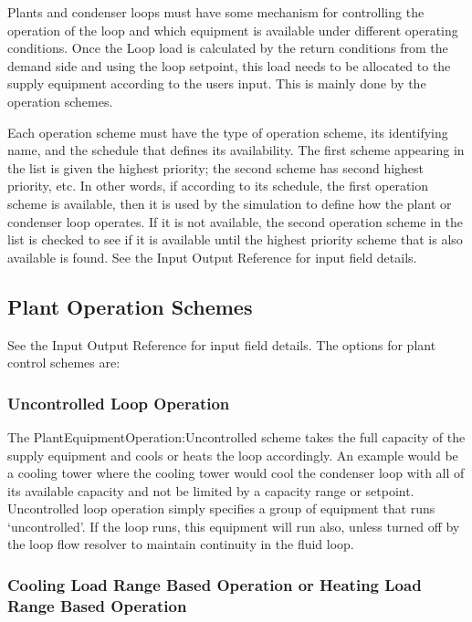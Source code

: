 Plants and condenser loops must have some mechanism for controlling the operation of the loop and which equipment is available under different operating conditions. Once the Loop load is calculated by the return conditions from the demand side and using the loop setpoint, this load needs to be allocated to the supply equipment according to the users input. This is mainly done by the operation schemes.

Each operation scheme must have the type of operation scheme, its identifying name, and the schedule that defines its availability. The first scheme appearing in the list is given the highest priority; the second scheme has second highest priority, etc. In other words, if according to its schedule, the first operation scheme is available, then it is used by the simulation to define how the plant or condenser loop operates. If it is not available, the second operation scheme in the list is checked to see if it is available until the highest priority scheme that is also available is found. See the Input Output Reference for input field details.

\subsection{Plant Operation Schemes}\label{plant-operation-schemes}

See the Input Output Reference for input field details. The options for plant control schemes are:

\subsubsection{Uncontrolled Loop Operation}\label{uncontrolled-loop-operation}

The PlantEquipmentOperation:Uncontrolled scheme takes the full capacity of the supply equipment and cools or heats the loop accordingly. An example would be a cooling tower where the cooling tower would cool the condenser loop with all of its available capacity and not be limited by a capacity range or setpoint. Uncontrolled loop operation simply specifies a group of equipment that runs `uncontrolled'. If the loop runs, this equipment will run also, unless turned off by the loop flow resolver to maintain continuity in the fluid loop.

\subsubsection{Cooling Load Range Based Operation or Heating Load Range Based Operation}\label{cooling-load-range-based-operation-or-heating-load-range-based-operation}

